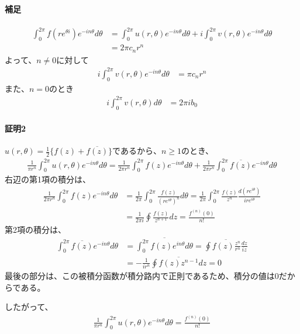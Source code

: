 \paragraph{補足}
\begin{align*}
    \int_{0}^{2\pi}f(re^{\theta i})e^{-in\theta}d\theta
    &=\int_{0}^{2\pi}u(r,\theta)e^{-in\theta}d\theta
    +i\int_{0}^{2\pi}v(r,\theta)e^{-in\theta}d\theta\\
    &=2\pi c_nr^n
\end{align*}
よって、$n\neq0$に対して
\begin{align*}
    i\int_{0}^{2\pi}v(r,\theta)e^{-in\theta}d\theta
    &=\pi c_nr^n
\end{align*}
また、$n=0$のとき
\begin{align*}
    i\int_{0}^{2\pi}v(r,\theta)d\theta
    &=2\pi ib_0
\end{align*}

\paragraph{証明2}
$u(r,\theta)=\frac{1}{2}\{f(z)+\overline{f(z)}\}$であるから、$n\ge1$のとき、
\begin{align*}
    \frac{1}{\pi r^n}\int_{0}^{2\pi}u(r,\theta)e^{-in\theta}d\theta
    =\frac{1}{2\pi r^n}\int_{0}^{2\pi}f(z)e^{-in\theta}d\theta
     +\frac{1}{2\pi r^n}\int_{0}^{2\pi}\overline{f(z)}e^{-in\theta}d\theta
\end{align*}
右辺の第1項の積分は、
\begin{align*}
    \frac{1}{2\pi r^n}\int_{0}^{2\pi}f(z)e^{-in\theta}d\theta
    &=\frac{1}{2\pi}\int_{0}^{2\pi}\frac{f(z)}{(re^{i\theta})^n}d\theta
    =\frac{1}{2\pi}\int_{0}^{2\pi}\frac{f(z)}{z^n}\frac{d(re^{i\theta})}{ire^{i\theta}}\\
    &=\frac{1}{2\pi i}\oint\frac{f(z)}{z^{n+1}}dz=\frac{f^{(n)}(0)}{n!}
\end{align*}
第2項の積分は、
\begin{align*}
    \int_{0}^{2\pi}\overline{f(z)}e^{-in\theta}d\theta
    &=\overline{\int_{0}^{2\pi}f(z)e^{in\theta}d\theta}
    =\overline{\oint f(z)\frac{z^n}{r^n}\frac{dz}{iz}}\\
    &=-\frac{1}{ir^n}\overline{\oint f(z)z^{n-1}dz}=0
\end{align*}
最後の部分は、この被積分函数が積分路内で正則であるため、積分の値は0だからである。

したがって、
\begin{align*}
    \frac{1}{\pi r^n}\int_{0}^{2\pi}u(r,\theta)e^{-in\theta}d\theta
    =\frac{f^{(n)}(0)}{n!}
\end{align*}

